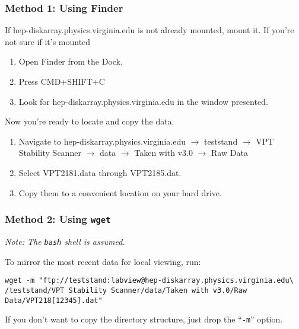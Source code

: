 \subsubsection{Method 1: Using Finder}
\label{sec:op_start:data:finder}

If \textsf{hep-diskarray.physics.virginia.edu} is not already mounted, mount it.  If you're not sure if it's mounted
\begin{enumerate}
\item Open \textsf{Finder} from the Dock.
\item Press CMD+SHIFT+C
\item Look for \textsf{hep-diskarray.physics.virginia.edu} in the window presented.
\end{enumerate}

Now you're ready to locate and copy the data.
\begin{enumerate}
\item Navigate to \textsf{hep-diskarray.physics.virginia.edu $\to$ teststand $\to$ VPT Stability Scanner $\to$ data $\to$ Taken with v3.0 $\to$ Raw Data}
\item Select \textsf{VPT2181.data} through \textsf{VPT2185.dat}.
\item Copy them to a convenient location on your hard drive.
\end{enumerate}


\subsubsection{Method 2: Using \texttt{wget}}
\label{sec:op_start:data:wget}
\textit{Note: The \texttt{bash} shell is assumed.}

To mirror the most recent data for local viewing, run:
\begin{verbatim}
wget -m "ftp://teststand:labview@hep-diskarray.physics.virginia.edu\
/teststand/VPT Stability Scanner/data/Taken with v3.0/Raw Data/VPT218[12345].dat"
\end{verbatim}

If you don't want to copy the directory structure, just drop the ``\texttt{-m}'' option.